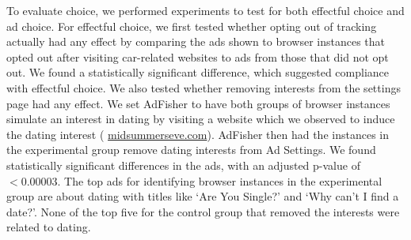 \documentclass[10pt, onecolumn]{report}
\begin{document}
To evaluate choice, we performed experiments to test for both effectful choice and
ad choice. 
For effectful choice, we first tested whether opting out of tracking actually had 
any effect by comparing the ads shown to browser instances that opted 
out after visiting car-related websites to ads from those that did not opt out.
We found a statistically significant difference, which suggested compliance
with effectful choice.
We also tested whether removing interests from the settings page had any effect.
We set AdFisher to have both groups of browser instances simulate an interest in dating 
by visiting a website which we observed to induce the dating 
interest ( \url{midsummerseve.com}). 
AdFisher then had the instances in the experimental group remove dating interests 
from Ad Settings.
We found statistically significant differences in the ads, with an adjusted 
p-value of $< 0.00003$.
%
The top ads for identifying browser instances in the experimental group are about dating 
with titles like `Are You Single?' and `Why can't I find a date?'.
None of the top five for the control group that removed the 
interests were related to dating.

\end{document}
